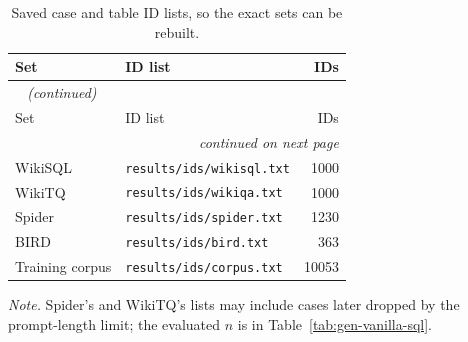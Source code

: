 {\small
{}
\setlength{\tabcolsep}{4.2pt}
\begin{longtable}{@{}llr@{}}
\caption{Saved case and table ID lists, so the exact sets can be rebuilt.}\label{tab:gen-idlists}\\
\toprule
\rowcolor{headshade}Set & ID list & IDs\\
\midrule
\endfirsthead
\multicolumn{3}{l}{\textit{\tablename~\thetable{} (continued)}}\\
\toprule
\rowcolor{headshade}Set & ID list & IDs\\
\midrule
\endhead
\midrule
\multicolumn{3}{r}{\textit{continued on next page}}\\
\endfoot
\bottomrule
\endlastfoot
WikiSQL & \texttt{results/ids/wikisql.txt} & 1000\\
WikiTQ & \texttt{results/ids/wikiqa.txt} & 1000\\
Spider & \texttt{results/ids/spider.txt} & 1230\\
BIRD & \texttt{results/ids/bird.txt} & 363\\
Training corpus & \texttt{results/ids/corpus.txt} & 10053\\
\end{longtable}
}
\vspace{-0.6\baselineskip}
{\footnotesize\color{slate}\textit{Note.} Spider's and WikiTQ's lists may include cases later dropped by the prompt-length limit; the evaluated $n$ is in Table~\ref{tab:gen-vanilla-sql}.\par}
\medskip

